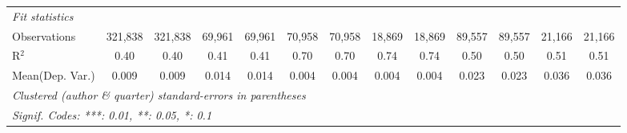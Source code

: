 \begin{tabular}{lcccccccccccc}
   \midrule
   \emph{Fit statistics}\\
   Observations                             & 321,838      & 321,838     & 69,961        & 69,961         & 70,958      & 70,958        & 18,869       & 18,869       & 89,557       & 89,557   & 21,166       & 21,166\\  
   R$^2$                                    & 0.40         & 0.40        & 0.41          & 0.41           & 0.70        & 0.70          & 0.74         & 0.74         & 0.50         & 0.50     & 0.51         & 0.51\\  
Mean(Dep. Var.) & 0.009 & 0.009 & 0.014 & 0.014 & 0.004 & 0.004 & 0.004 & 0.004 & 0.023 & 0.023 & 0.036 & 0.036 \\
   \midrule \midrule
   \multicolumn{13}{l}{\emph{Clustered (author \& quarter) standard-errors in parentheses}}\\
   \multicolumn{13}{l}{\emph{Signif. Codes: ***: 0.01, **: 0.05, *: 0.1}}\\
\end{tabular}
\par\endgroup
